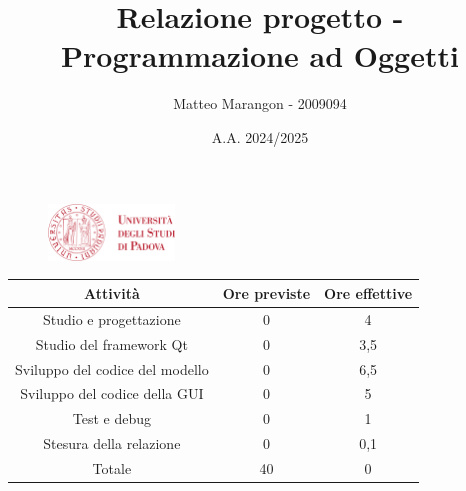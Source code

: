 \documentclass[10pt]{article}
\title{Relazione progetto - Programmazione ad Oggetti}
\author{Matteo Marangon - 2009094}
\date{A.A. 2024/2025}
\begin{document}
\begin{figure}
    \centering
    \includegraphics[width=0.3\textwidth]{./unipdlogo.png}
\end{figure}
\maketitle

\newpage

\tableofcontents
\newpage

\begin{center}
    \begin{tabular}{| c | c | c |} \hline
    Attività & Ore previste & Ore effettive \\\hline
    Studio e progettazione & 0 & 4 \\
    Studio del framework Qt & 0 & 3,5 \\
    Sviluppo del codice del modello & 0 & 6,5 \\
    Sviluppo del codice della GUI & 0 & 5 \\
    Test e debug & 0 & 1 \\
    Stesura della relazione & 0 & 0,1 \\\hline
    Totale & 40 & 0 \\\hline
    \end{tabular}
\end{center}
\end{document}
